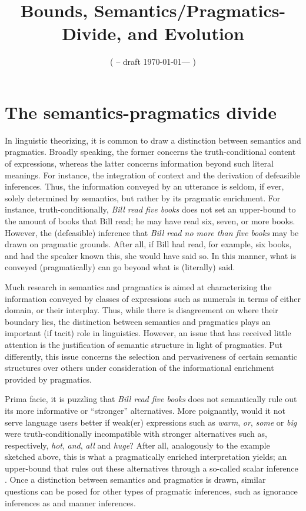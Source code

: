 \documentclass[a4paper]{article}
\title{Bounds, Semantics/Pragmatics-Divide, and Evolution}
\author{%
    ( -- draft \today --- )
}
\date{}
\begin{document}
\maketitle
\tableofcontents
\section{The semantics-pragmatics divide}\label{sec:introduction}

In linguistic theorizing, it is common to draw a distinction between semantics and pragmatics. Broadly speaking, the former concerns the truth-conditional content of expressions, whereas the latter concerns information beyond such literal meanings. For instance, the integration of context and the derivation of defeasible inferences. Thus, the information conveyed by an utterance is seldom, if ever, solely determined by semantics, but rather by its pragmatic enrichment. For instance, truth-conditionally, {\em Bill read five books} does not set an upper-bound to the amount of books that Bill read; he may have read six, seven, or more books. However, the (defeasible) inference that {\em Bill read no more than five books} may be drawn on pragmatic grounds. After all, if Bill had read, for example, six books, and had the speaker known this, she would have said so. In this manner, what is conveyed (pragmatically) can go beyond what is (literally) said. 


Much research in semantics and pragmatics is aimed at characterizing the information conveyed by classes of expressions such as numerals in terms of either domain, or their interplay. Thus, while there is disagreement on where their boundary lies, the distinction between semantics and pragmatics plays an important (if tacit) role in linguistics. However, an issue that has received little attention is the justification of semantic structure in light of pragmatics. Put differently, this issue concerns the selection and pervasiveness of certain semantic structures over others under consideration of the informational enrichment provided by pragmatics. 

Prima facie, it is puzzling that {\em Bill read five books} does not semantically rule out its more informative or ``stronger'' alternatives. More poignantly, would it not serve language users better if weak(er) expressions such as {\em warm}, {\em or}, {\em some} or {\em big} were truth-conditionally incompatible with stronger alternatives such as, respectively, {\em hot}, {\em and}, {\em all} and {\em huge}? After all, analogously to the example sketched above, this is what a pragmatically enriched interpretation yields; an upper-bound that rules out these alternatives through a so-called scalar inference \citep{horn:1972,gazdar:1979}. Once a distinction between semantics and pragmatics is drawn, similar questions can be posed for other types of pragmatic inferences, such as ignorance inferences as and manner inferences.
\end{document}
